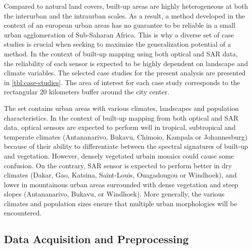 \documentclass[remotesensing,article,submit,moreauthors,pdftex,10pt,a4paper]{Definitions/mdpi}
\begin{document}
Compared to natural land covers, built-up areas are highly heterogeneous at both
the interurban and the intraurban scales. As a result, a method developed in the
context of an european urban areas has no guarantee to be reliable in a small
urban agglomeration of Sub-Saharan Africa. This is why a diverse set of case
studies is crucial when seeking to maximize the generalization potential of a
method. In the context of built-up mapping using both optical and SAR data, the
reliability of each sensor is expected to be highly dependent on landscape and
climate variables. The selected case studies for the present analysis are
presented in \autoref{tbl:case-studies}. The area of interest for each case
study corresponds to the rectangular 20 kilometers buffer around the city
center.

The set contains urban areas with various climates, landscapes and population
characteristics. In the context of built-up mapping from both optical and SAR
data, optical sensors are expected to perform well in tropical, subtropical and
temperate climates (Antananarivo, Bukavu, Chimoio, Kampala or Johannesburg)
because of their ability to differentiate between the spectral signatures of
built-up and vegetation. However, densely vegetated urbain mosaics could cause
some confusion. On the contrary, SAR sensor is expected to perform better in dry
climates (Dakar, Gao, Katsina, Saint-Louis, Ouagadougou or Windhoek), and lower
in mountainous urban areas surrounded with dense vegetation and steep slopes
(Antananarivo, Bukavu, or Windhoek). More generally, the various climates and
population sizes ensure that multiple urban morphologies will be encountered.

\subsection{Data Acquisition and Preprocessing}
\end{document}
